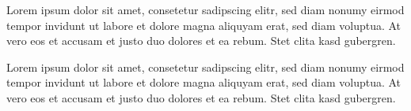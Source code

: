\begin{tcolorbox}[]

Lorem ipsum dolor sit amet, consetetur sadipscing elitr, sed diam nonumy
eirmod tempor invidunt ut labore et dolore magna aliquyam erat, sed diam
voluptua. At vero eos et accusam et justo duo dolores et ea rebum. Stet
clita kasd gubergren.

\end{tcolorbox}



\begin{tcolorbox}[colback=c_ffffff,colframe=c_000000,title=Title]

Lorem ipsum dolor sit amet, consetetur sadipscing elitr, sed diam nonumy
eirmod tempor invidunt ut labore et dolore magna aliquyam erat, sed diam
voluptua. At vero eos et accusam et justo duo dolores et ea rebum. Stet
clita kasd gubergren.

\end{tcolorbox}
